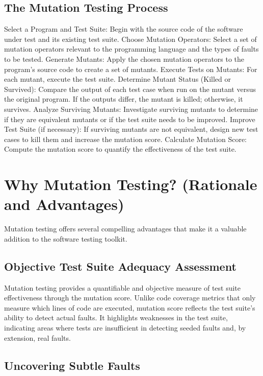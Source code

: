 \documentclass[sigplan, nonacm]{acmart}
\begin{document}
\subsection{The Mutation Testing Process}

Select a Program and Test Suite: Begin with the source code of the software under test and its
existing test suite.
Choose Mutation Operators: Select a set of mutation operators relevant to the programming language
and the types of faults to be tested.
Generate Mutants: Apply the chosen mutation operators to the program's source code to create a set
of mutants.
Execute Tests on Mutants: For each mutant, execute the test suite.
Determine Mutant Status (Killed or Survived): Compare the output of each test case when run on the
mutant versus the original program. If the outputs differ, the mutant is killed; otherwise, it
survives.
Analyze Surviving Mutants: Investigate surviving mutants to determine if they are equivalent
mutants or if the test suite needs to be improved.
Improve Test Suite (if necessary): If surviving mutants are not equivalent, design new test cases
to kill them and increase the mutation score.
Calculate Mutation Score: Compute the mutation score to quantify the effectiveness of the test
suite.

\section{Why Mutation Testing? (Rationale and Advantages)}

Mutation testing offers several compelling advantages that make it a valuable addition to the
software testing toolkit.

\subsection{Objective Test Suite Adequacy Assessment}

Mutation testing provides a quantifiable and objective measure of test suite effectiveness through
the mutation score. Unlike code coverage metrics that only measure which lines of code are
executed, mutation score reflects the test suite's ability to detect actual faults.
It highlights weaknesses in the test suite, indicating areas where tests are insufficient in
detecting seeded faults and, by extension, real faults.
\subsection{Uncovering Subtle Faults}
\end{document}

